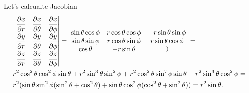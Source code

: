 \documentclass[main.tex]{subfiles}
\begin{document}
Let's calcualte Jacobian
\begin{align*}
& \begin{vmatrix}
\cfrac{\partial x}{\partial r} & \cfrac{\partial x}{\partial \theta} & \cfrac{\partial x}{\partial \phi} \\
\cfrac{\partial y}{\partial r} & \cfrac{\partial y}{\partial \theta} & \cfrac{\partial y}{\partial \phi} \\
\cfrac{\partial z}{\partial r} & \cfrac{\partial z}{\partial \theta} & \cfrac{\partial z}{\partial \phi} \\
\end{vmatrix} =
\begin{vmatrix}
\sin \theta \cos \phi & r \cos \theta \cos \phi & - r \sin \theta \sin \phi \\
\sin \theta \sin \phi & r \cos \theta \sin \phi & r \sin \theta \cos \phi \\
\cos \theta & - r \sin \theta & 0                                                                                                                                                                                                                                                                                                                                                                                                                                                                                                                                                                                                                                                                                                                                                                                                                                                                                                                                                                                                                                                                                                                                                                                                                                                                                                                                                                     
\end{vmatrix} = \\
& r^2 \cos^2 \theta \cos^2 \phi \sin \theta +  r^2 \sin^3 \theta \sin^2 \phi
+ r^2 \cos^2\theta \sin^2 \phi \sin\theta
+ r^2 \sin^3 \theta \cos^2 \phi = \\
& r^2(\sin\theta \sin^2\phi(\sin^2\theta + \cos^2\theta) + \sin\theta\cos^2\phi(\cos^2\theta + \sin^2\theta)) = r^2 \sin\theta.
\end{align*}
 
\end{document}
